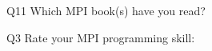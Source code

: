 \begin{description}%
\item{Q11} Which MPI book(s) have you read?%
\item{Q3} Rate your MPI programming skill:%
\end{description}%
